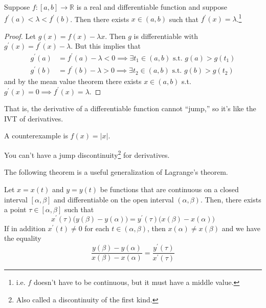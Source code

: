   \begin{theorem}
    Suppose $f: [a, b] \to \mathbb{R}$ is a real and differentiable function and suppose $f^\prime (a) < \lambda < f^\prime (b)$. Then there exists $x \in (a, b)$ such that $f^\prime (x) = \lambda$.\footnote{i.e. $f$ doesn't have to be continuous, but it must have a middle value.}
  \end{theorem}
  \begin{proof}
    Let $g(x) = f(x) - \lambda x$. Then $g$ is differentiable with $g^\prime (x) = f^\prime (x) - \lambda$. But this implies that
    \begin{align}
      g^\prime (a) & = f^\prime (a) - \lambda < 0 \implies \exists t_1 \in (a, b) \text{ s.t. } g(a) > g(t_1) \\
      g^\prime (b) & = f^\prime (b) - \lambda > 0 \implies \exists t_2 \in (a, b) \text{ s.t. } g(b) > g(t_2) 
    \end{align}
    and by the mean value theorem there exists $x \in (a, b)$ s.t. $g^\prime (x) = 0 \implies f^\prime (x) = \lambda$. 
  \end{proof}

  That is, the derivative of a differentiable function cannot ``jump,'' so it's like the IVT of derivatives. 

  \begin{example}
    A counterexample is $f(x) = |x|$. 
  \end{example}

  \begin{corollary}
    You can't have a jump discontinuity\footnote{Also called a discontinuity of the first kind.} for derivatives. 
  \end{corollary}

  The following theorem is a useful generalization of Lagrange's theorem. 

  \begin{theorem}
    Let $x = x(t)$ and $y = y(t)$ be functions that are continuous on a closed interval $[\alpha, \beta]$ and differentiable on the open interval $(\alpha, \beta)$. Then, there exists a point $\tau \in [\alpha, \beta]$ such that
    \begin{equation}
      x^\prime (\tau) \big( y(\beta) - y (\alpha)\big) = y^\prime (\tau) \big( x(\beta) - x(\alpha)\big)
    \end{equation}
    If in addition $x^\prime (t) \neq 0$ for each $t \in (\alpha, \beta)$, then $x(\alpha) \neq x(\beta)$ and we have the equality 
    \begin{equation}
      \frac{y(\beta) - y(\alpha)}{x(\beta) - x(\alpha)} = \frac{y^\prime (\tau)}{x^\prime (\tau)}
    \end{equation}
  \end{theorem}

